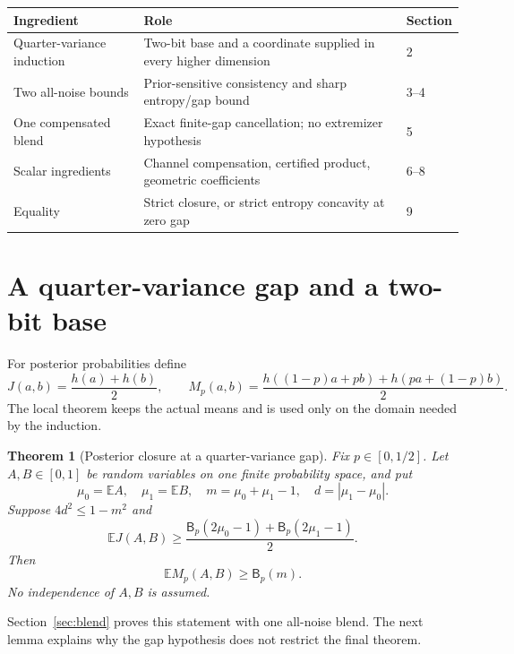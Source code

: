 \documentclass[11pt]{article}
\newtheorem{theorem}{Theorem}[section]
\theoremstyle{remark}\newtheorem{remark}[theorem]{Remark}
\newcommand{\E}{\mathbb E}\newcommand{\PP}{\mathbb P}\newcommand{\dd}{\,\mathrm d}
\newcommand{\Bprof}{\mathsf B_p}\newcommand{\Pprof}{\Phi_p}
\numberwithin{equation}{section}
\begin{document}
\begin{center}
\begin{tabular}{p{}p{}p{}}
\toprule
Ingredient & Role & Section\\
\midrule
Quarter-variance induction & Two-bit base and a coordinate supplied in every higher dimension & 2\\
Two all-noise bounds & Prior-sensitive consistency and sharp entropy/gap bound & 3--4\\
One compensated blend & Exact finite-gap cancellation; no extremizer hypothesis & 5\\
Scalar ingredients & Channel compensation, certified product, geometric coefficients & 6--8\\
Equality & Strict closure, or strict entropy concavity at zero gap & 9\\
\bottomrule
\end{tabular}
\end{center}
\section{A quarter-variance gap and a two-bit base}\label{sec:induction}
For posterior probabilities define
\[
 J(a,b)=\frac{h(a)+h(b)}2,\qquad
 M_p(a,b)=\frac{h((1-p)a+pb)+h(pa+(1-p)b)}2.
\]
The local theorem keeps the actual means and is used only on the domain
needed by the induction.
\begin{theorem}[Posterior closure at a quarter-variance gap]\label{thm:closure}
Fix $p\in[0,1/2]$. Let $A,B\in[0,1]$ be random variables on one finite
probability space, and put
\[
 \mu_0=\E A,\quad\mu_1=\E B,\quad
 m=\mu_0+\mu_1-1,\quad d=|\mu_1-\mu_0|.
\]
Suppose $4d^2\le1-m^2$ and
\begin{equation}\label{eq:childhyp}
 \E J(A,B)\ge\frac{\Bprof(2\mu_0-1)+\Bprof(2\mu_1-1)}2.
\end{equation}
Then
\begin{equation}\label{eq:closure}
 \E M_p(A,B)\ge\Bprof(m).
\end{equation}
No independence of $A,B$ is assumed.
\end{theorem}
Section~\ref{sec:blend} proves this statement with one all-noise blend. The next lemma
explains why the gap hypothesis does not restrict the final theorem.
\end{document}
